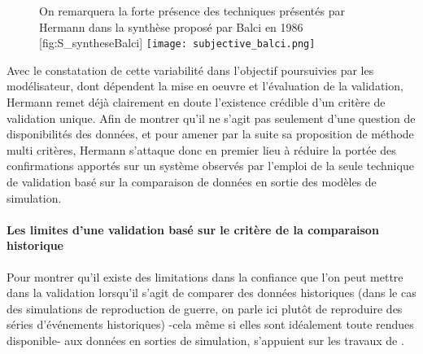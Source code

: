 \begin{figure}[h]
\begin{sidecaption}[fortoc]{ On remarquera la forte présence des techniques présentés par Hermann dans la synthèse proposé par Balci en 1986 \autocite{Balci1986}}[fig:S_syntheseBalci]
  \centering
 \texttt{[image: subjective\_balci.png]}
  \end{sidecaption}
\end{figure}

Avec le constatation de cette variabilité dans l'objectif poursuivies par les modélisateur, dont dépendent la mise en oeuvre et l'évaluation de la validation, Hermann remet déjà clairement en doute l'existence crédible d'un critère de validation unique. Afin de montrer qu'il ne s'agit pas seulement d'une question de disponibilités des données, et pour amener par la suite sa proposition de méthode multi critères, Hermann s'attaque donc en premier lieu à réduire la portée des confirmations apportés sur un système observés par l'emploi de la seule technique de validation basé sur la comparaison de données en sortie des modèles de simulation.

\paragraph{Les limites d'une validation basé sur le critère de la comparaison historique}

Pour montrer qu'il existe des limitations dans la confiance que l'on peut mettre dans la validation lorsqu'il s'agit de comparer des données historiques (dans le cas des simulations de reproduction de guerre, on parle ici plutôt de reproduire des séries d'événements historiques) -cela même si elles sont idéalement toute rendues disponible- aux données en sorties de simulation, \textcite{Hermann1967b} s'appuient sur les travaux de \textcite{Pool1965}.

